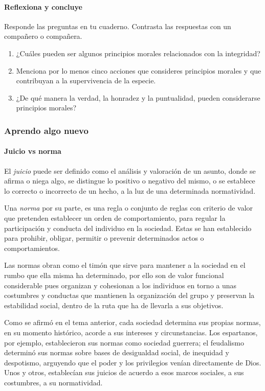 \documentclass[10pt,twoside]{article}
\begin{document}
\paragraph*{Reflexiona y concluye}
Responde las preguntas en tu cuaderno. Contrasta las respuestas con un compañero o compañera.
\begin{enumerate}
\item ¿Cuáles pueden ser algunos principios morales relacionados con la integridad?
\item  Menciona por lo menos cinco acciones que consideres principios morales y que contribuyan a la supervivencia de la especie.
\item ¿De qué manera la verdad, la honradez y la puntualidad, pueden considerarse principios morales?
\end{enumerate}
\subsubsection*{Aprendo algo nuevo}
\paragraph*{Juicio vs norma}

El \emph{juicio} puede ser definido como el análisis y valoración de un asunto, donde se afirma o niega algo, se distingue lo positivo o negativo del mismo, o se establece lo correcto o incorrecto de un hecho, a la luz de una determinada normatividad.

Una \emph{norma} por su parte, es una regla o conjunto de reglas con criterio de valor que pretenden establecer un orden de comportamiento, para regular la participación y conducta del individuo en la sociedad. Estas se han establecido para prohibir, obligar, permitir o prevenir determinados actos o comportamientos.

Las normas obran como el timón que sirve para mantener a la sociedad en el rumbo que ella misma ha determinado, por ello son de valor funcional considerable pues organizan y cohesionan a los individuos en torno a unas costumbres y conductas que mantienen la organización
del grupo y preservan la estabilidad social, dentro de la ruta que ha de llevarla a sus objetivos.

Como se afirmó en el tema anterior, cada sociedad determina sus propias normas, en su momento histórico, acorde a sus intereses y circunstancias. Los espartanos, por ejemplo, establecieron sus normas como sociedad guerrera; el feudalismo determinó sus normas sobre
bases de desigualdad social, de inequidad y despotismo, arguyendo que el poder y los privilegios venían directamente de Dios. Unos y otros, establecían sus juicios de acuerdo a esos marcos sociales, a sus
costumbres, a su normatividad.
\end{document}
